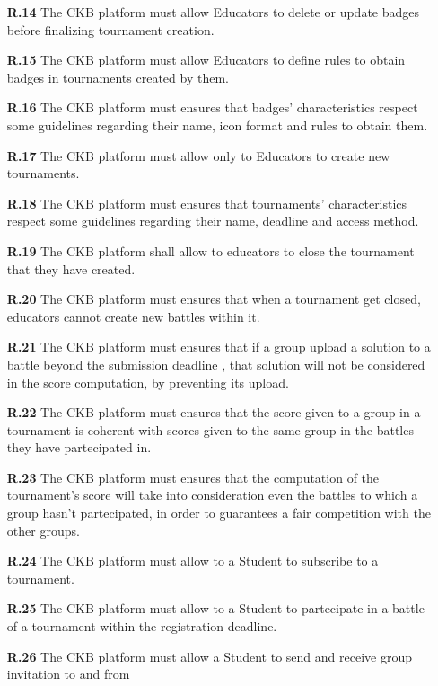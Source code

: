 \documentclass{article}
\begin{document}
{\begin{itemize}
            \item[\textbf{R.14}] The CKB platform must allow Educators to delete or update badges before finalizing tournament creation.
            \item[\textbf{R.15}] The CKB platform must allow Educators to define rules to obtain badges in tournaments created by them.
            \item[\textbf{R.16}] The CKB platform must ensures that badges' characteristics respect some guidelines regarding their
            name, icon format and rules to obtain them.
            \item[\textbf{R.17}] The CKB platform must allow only to Educators to create new tournaments.
            \item[\textbf{R.18}] The CKB platform must ensures that tournaments' characteristics respect some guidelines regarding their
            name, deadline and access method. 
            \item[\textbf{R.19}] The CKB platform shall allow to educators to close the tournament that they have created.
            \item[\textbf{R.20}] The CKB platform must ensures that when a tournament get closed, educators cannot create new battles
            within it.
            \item[\textbf{R.21}] The CKB platform must ensures that if a group upload a solution to a battle beyond the submission deadline
            , that solution will not be considered in the score computation, by preventing its upload.
            \item[\textbf{R.22}] The CKB platform must ensures that the score given to a group in a tournament is
            coherent with scores given to the same group in the battles they have partecipated in.
            \item[\textbf{R.23}] The CKB platform must ensures that the computation of the tournament's score
            will take into consideration even the battles to which a group hasn't partecipated, in order to guarantees
            a fair competition with the other groups.
            \item[\textbf{R.24}] The CKB platform must allow to a Student to subscribe to a tournament.
            \item[\textbf{R.25}] The CKB platform must allow to a Student to partecipate in a battle of a tournament
            within the registration deadline.
            \item[\textbf{R.26}] The CKB platform must allow a Student to send and receive group invitation to and from

\end{itemize}}
\end{document}
